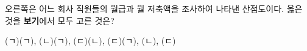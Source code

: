 \noindent\begin{minipage}[t]{0.58\linewidth}\vspace{0pt}\raggedright 오른쪽은 어느 회사 직원들의 월급과 월 저축액을 조사하여 나타낸 산점도이다. 옳은 것을 \textbf{보기}에서 모두 고른 것은? \end{minipage}\hfill\begin{minipage}[t]{0.4\linewidth}\vspace{0pt}\centering \resizebox{\ifdim\width>\linewidth\linewidth\else\width\fi}{!}{}\end{minipage}\par
\noindent {}
\begin{choices32}{(ㄱ)}{(ㄱ), (ㄴ)}{(ㄱ), (ㄷ)}{(ㄴ), (ㄷ)}{(ㄱ), (ㄴ), (ㄷ)}\end{choices32}
